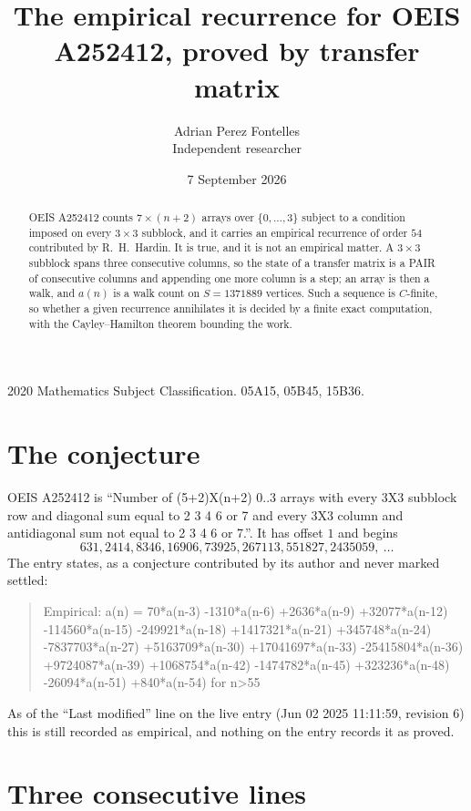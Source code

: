 \documentclass[11pt,a4paper]{article}
\title{The empirical recurrence for OEIS A252412, proved by transfer matrix}
\author{Adrian Perez Fontelles\\ \small Independent researcher}
\date{7 September 2026}
\theoremstyle{plain}
\theoremstyle{definition}
\begin{document}
\maketitle

\begin{abstract}
OEIS A252412 counts $7\times(n+2)$ arrays over $\{0,\dots,3\}$ subject to a condition imposed on
every $3\times3$ subblock, and it carries an empirical recurrence of order $54$
contributed by R.~H.~Hardin. It is true, and it is not an empirical matter. A $3\times3$
subblock spans three consecutive columns, so the state of a transfer matrix is a PAIR of
consecutive columns and appending one more column is a step; an array is then a walk, and
$a(n)$ is a walk count on $S=1371889$ vertices. Such a sequence is $C$-finite, so whether a given
recurrence annihilates it is decided by a finite exact computation, with the Cayley--Hamilton
theorem bounding the work.
\end{abstract}

\noindent\small 2020 Mathematics Subject Classification. 05A15, 05B45, 15B36.\normalsize

\section{The conjecture}

OEIS A252412 is ``Number of (5+2)X(n+2) 0..3 arrays with every 3X3 subblock row and diagonal sum equal to 2 3 4 6 or 7 and every 3X3 column and antidiagonal sum not equal to 2 3 4 6 or 7.''. It has offset $1$ and begins
\[
631, 2414, 8346, 16906, 73925, 267113, 551827, 2435059,\ \dots
\]
The entry states, as a conjecture contributed by its author and never marked settled:
\begin{quote}
Empirical: a(n) = 70*a(n-3) -1310*a(n-6) +2636*a(n-9) +32077*a(n-12) -114560*a(n-15) -249921*a(n-18) +1417321*a(n-21) +345748*a(n-24) -7837703*a(n-27) +5163709*a(n-30) +17041697*a(n-33) -25415804*a(n-36) +9724087*a(n-39) +1068754*a(n-42) -1474782*a(n-45) +323236*a(n-48) -26094*a(n-51) +840*a(n-54) for n>55
\end{quote}
As of the ``Last modified'' line on the live entry (Jun 02 2025 11:11:59, revision 6) this is still
recorded as empirical, and nothing on the entry records it as proved.

\section{Three consecutive lines}
\end{document}
